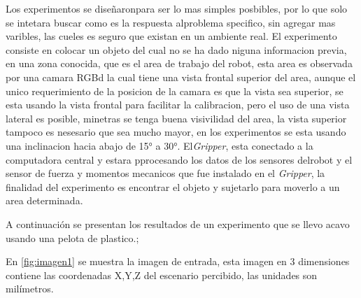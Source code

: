 Los experimentos se diseñaronpara ser lo mas simples posbibles, por lo que solo se intetara buscar como es la respuesta alproblema specifico, sin agregar mas varibles, las cueles es seguro que existan en un ambiente real.
El experimento consiste en colocar un objeto del cual no se ha dado niguna informacion previa, en una zona conocida, que es el area de trabajo del robot, esta area es observada por una camara RGBd la cual tiene una vista frontal superior del area, aunque el unico requerimiento de la posicion de la camara es que la vista sea superior, se esta usando la vista frontal para facilitar la calibracion, pero el uso de una vista lateral es posible, minetras se tenga buena visivilidad del area, la vista superior tampoco es nesesario que sea mucho mayor, en los experimentos se esta usando una inclinacion hacia abajo de 15° a 30°. El\textit{Gripper}, esta conectado a la computadora central y estara pprocesando los datos de los sensores delrobot y el sensor de fuerza y momentos mecanicos que fue instalado en el \textit{Gripper}, la finalidad del experimento es encontrar el objeto y sujetarlo para moverlo a un area determinada.

A continuación se presentan los resultados de un experimento que se llevo acavo usando una pelota de plastico.;

En  \cref{fig:imagen1} se muestra la imagen de entrada, esta imagen en 3 dimensiones contiene las coordenadas X,Y,Z del escenario percibido, las unidades son milímetros.

